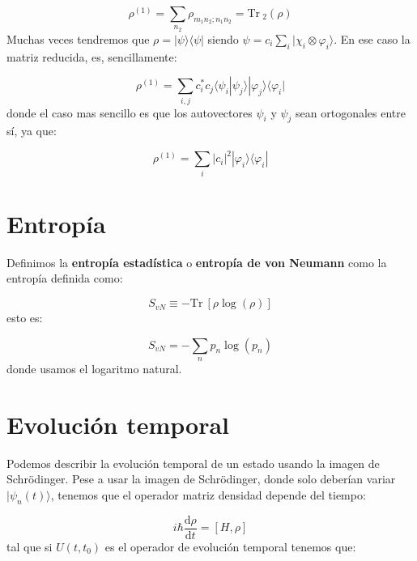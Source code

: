 \documentclass[12pt]{book}
\numberwithin{equation}{chapter}
\numberwithin{figure}{chapter}
\newcommand{\ccorchetes}[1]{\left[ #1  \right]}
\newcommand{\D}{\mathrm{d}}
\newcommand{\derivadas}[2]{\frac{\D #1}{\D #2}}
\newcommand{\Tr}{\mathrm{Tr} \ }
\begin{document}
\begin{equation}
\rho^{(1)}  = \sum_{n_2} \rho_{m_1 n_2; n_1 n_2}  = \Tr_2 (\rho)
\end{equation}
Muchas veces tendremos que $\rho = |\psi \rangle \langle \psi |$ siendo $\psi = c_i \sum_i |\chi_i \otimes \varphi_i \rangle$. En ese caso la matriz reducida, es, sencillamente:

\begin{equation}
\rho^{(1)} = \sum_{i,j} c_i^* c_j \langle \psi_i | \psi_j \rangle | \varphi_j \rangle \langle \varphi_i |
\end{equation}
donde el caso mas sencillo es que los autovectores $\psi_i$ y $\psi_j$ sean ortogonales entre sí, ya que:

\begin{equation}
\rho^{(1)} = \sum_i |c_i|^2 |\varphi_i \rangle \langle \varphi_i |
\end{equation}



\section{Entropía}

Definimos la \textbf{entropía estadística} o \textbf{entropía de von Neumann} como la entropía definida como:

\begin{equation}
S_{vN} \equiv - \Tr \ccorchetes{\rho \log (\rho)}
\end{equation}
esto es:

\begin{equation}
S_{vN} = - \sum_n p_n \log (p_n)
\end{equation}
donde usamos el logaritmo natural. 

\section{Evolución temporal}

Podemos describir la evolución temporal de un estado usando la imagen de Schrödinger. Pese a usar la imagen de Schrödinger, donde solo deberían variar $| \psi_n(t) \rangle$, tenemos que el operador matriz densidad depende del tiempo: 


\begin{equation}
i \hbar \derivadas{\rho}{t} = [H, \rho]
\end{equation}
tal que si $U(t,t_0)$ es el operador de evolución temporal tenemos que:
\end{document}
